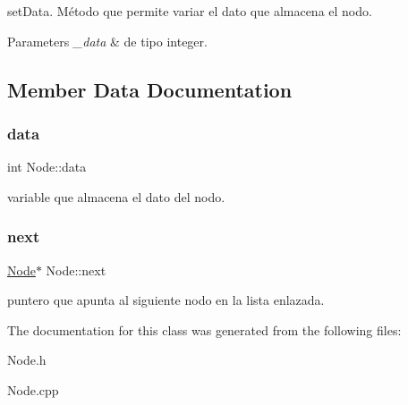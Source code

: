 set\+Data. Método que permite variar el dato que almacena el nodo. 
\begin{DoxyParams}{Parameters}
{\em \+\_\+data} & de tipo integer. \\
\hline
\end{DoxyParams}


\subsection{Member Data Documentation}
\mbox{\label{classNode_a87c003c9f600e3fc58e6e90835f0b605}} 
\subsubsection{\texorpdfstring{data}{data}}
{\footnotesize\ttfamily int Node\+::data}

variable que almacena el dato del nodo. \mbox{\label{classNode_a2559a716f69ccaa76d648d9f1b83065e}} 
\subsubsection{\texorpdfstring{next}{next}}
{\footnotesize\ttfamily \hyperlink{classNode}{Node}$\ast$ Node\+::next}

puntero que apunta al siguiente nodo en la lista enlazada. 

The documentation for this class was generated from the following files\+:\begin{DoxyCompactItemize}
\item 
Node.\+h\item 
Node.\+cpp\end{DoxyCompactItemize}
